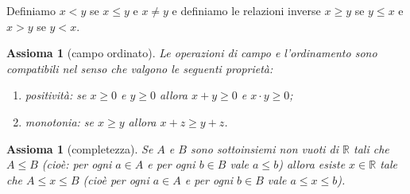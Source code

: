 \documentclass[italian,a4paper,oneside,headinclude]{scrbook}
\newcommand{\RR}{\mathbb R}
\newtheorem{axiom}[theorem]{Assioma}
\begin{document}
Definiamo $x<y$ se $x\le y$ e $x \neq y$ e definiamo le relazioni
inverse $x \ge y$ se $y\le x$ e $x>y$ se $y<x$.
\marginpar{$\ge$ $<$ $>$}

\begin{axiom}[campo ordinato]
Le operazioni di campo e l'ordinamento sono compatibili nel senso che
valgono le seguenti proprietà:
\begin{enumerate}
\item positività: se $x\ge 0$ e $y \ge 0$ allora $x+y \ge 0$ e $x\cdot y\ge 0$;
\item monotonia: se $x \ge y$ allora $x+z \ge y+z$.
\end{enumerate}
\end{axiom}

\begin{axiom}[completezza]\label{axiom_complete}
Se $A$ e $B$ sono sottoinsiemi non vuoti di $\RR$ tali che $A \le B$
(cioè: per ogni $a \in A$ e per ogni $b\in B$ vale $a\le b$) allora esiste
$x\in \RR$ tale che $A\le x \le B$ (cioè per ogni $a\in A$ e per ogni $b\in B$
vale $a\le x \le b$).
\end{axiom}
\end{document}
